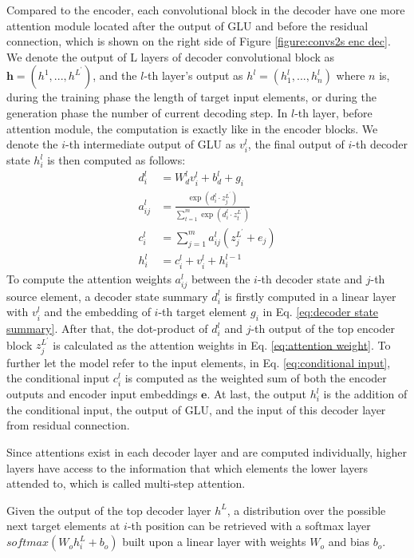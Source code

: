 Compared to the encoder, each convolutional block in the decoder have one more attention module located after the output of GLU and before the residual connection, which is shown on the right side of Figure \ref{figure:convs2s enc dec}. We denote the output of L layers of decoder convolutional block as $ \textbf{h} = (h^{1},...,h^{L^{'}}) $, and the $ l $-th layer's output as $ h^{l} = (h_{1}^{l},...,h_{n}^{l}) $ where $ n $ is, during the training phase the length of target input elements, or during the generation phase the number of current decoding step. In $ l $-th layer, before attention module, the computation is exactly like in the encoder blocks. We denote the $ i $-th intermediate output of GLU as $ v^{l}_{i} $, the final output of $ i $-th decoder state $ h_{i}^{l} $ is then computed as follows:
\begin{align}
d^{l}_{i} &= W^{l}_{d}v^{l}_{i} + b^{l}_{d} + g_{i} \label{eq:decoder state summary}\\
a^{l}_{ij} &= \frac{\exp(d^{l}_{i}\cdot z_{j}^{L^{'}})}{\sum_{t=1}^{m} \exp(d^{l}_{i}\cdot z_{t}^{L^{'}})} \label{eq:attention weight}\\
c^{l}_{i} &= \sum_{j=1}^{m} a^{l}_{ij}(z^{L^{'}}_{j}+e_{j}) \label{eq:conditional input}\\
h^{l}_{i} &= c^{l}_{i} + v^{l}_{i} + h^{l-1}_{i} \label{eq:decoder output}
\end{align}
To compute the attention weights $ a^{l}_{ij} $ between the $ i $-th decoder state and $ j $-th source element, a decoder state summary $ d^{l}_{i} $ is firstly computed in a linear layer with $ v^{l}_{i} $ and the embedding of $ i $-th target element $ g_{i} $ in Eq. \ref{eq:decoder state summary}. After that, the dot-product of $ d^{l}_{i} $ and $ j $-th output of the top encoder block $ z_{j}^{L^{'}} $ is calculated as the attention weights in Eq. \ref{eq:attention weight}. To further let the model refer to the input elements, in Eq. \ref{eq:conditional input}, the conditional input $ c_{i}^{l} $ is computed as the weighted sum of both the encoder outputs and encoder input embeddings $ \textbf{e} $. At last, the output $ h_{i}^{l} $ is the addition of the conditional input, the output of GLU, and the input of this decoder layer from residual connection. 

Since attentions exist in each decoder layer and are computed individually, higher layers have access to the information that which elements the lower layers attended to, which is called multi-step attention. 

Given the output of the top decoder layer $ h^{L} $, a distribution over the possible next target elements at $ i $-th position can be retrieved with a softmax layer $ softmax(W_{o}h_{i}^{L}+b_{o}) $ built upon a linear layer with weights $ W_{o} $ and bias $ b_{o} $. 

